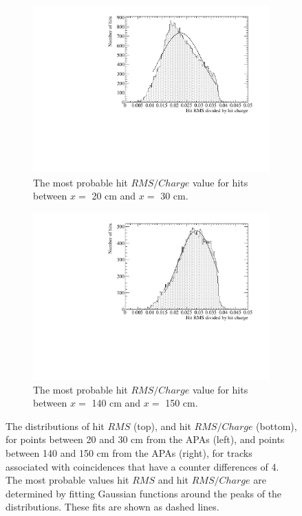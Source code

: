 \begin{figure}
\begin{subfigure}{0.48\textwidth}
    \includegraphics[width=\textwidth]{DataCan_2}
    \caption{The most probable hit $RMS/Charge$ value for hits between $x =$ 20 cm and $x =$ 30 cm.}
  \end{subfigure}%
  \hspace{0.03\textwidth}%
  \begin{subfigure}{0.48\textwidth}
    \centering
    \includegraphics[width=\textwidth]{DataCan_3}
    \caption{The most probable hit $RMS/Charge$ value for hits between $x =$ 140 cm and $x =$ 150 cm.}
  \end{subfigure}
  \caption[The most probable values of the $RMS$ and $RMS/Charge$ distributions for tracks with a counter difference of 4 in the 35 ton data]
          {The distributions of hit $RMS$ (top), and hit $RMS/Charge$ (bottom), for points between 20 and 30 cm from the APAs (left), and points between 140 and 150 cm from the APAs (right), for tracks associated with coincidences that have a counter differences of 4. The most probable values hit $RMS$ and hit $RMS/Charge$ are determined by fitting Gaussian functions around the peaks of the distributions. These fits are shown as dashed lines.}
          \label{fig:DiffDataHitFit}
\end{figure}

